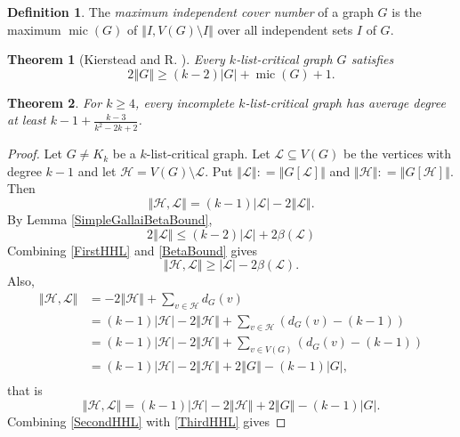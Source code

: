 \documentclass[12pt]{article}
\theoremstyle{plain}
\newtheorem{thm}{Theorem}[section]
\theoremstyle{definition}
\newtheorem{defn}{Definition}
\theoremstyle{remark}
\newcommand{\fancy}[1]{\mathcal{#1}}
\renewcommand{\L}{\fancy{L}}
\newcommand{\HH}{\fancy{H}}
\newcommand{\card}[1]{\left|#1\right|}
\newcommand{\size}[1]{\left\Vert#1\right\Vert}
\newcommand{\parens}[1]{\left( #1 \right)}
\newcommand{\DefinedAs}{\mathrel{\mathop:}=}
\newcommand{\mic}{\operatorname{mic}}
\begin{document}
\begin{defn} The \emph{maximum independent cover number }of a graph $G$
	is the maximum $\mic(G)$ of $\size{I, V(G) \setminus I}$ over all independent sets $I$
	of $G$. 
\end{defn}

\begin{thm}[Kierstead and R. \cite{KernelMagic}]\label{ConsantListMicStrength} 
	Every $k$-list-critical graph $G$ satisfies
	\[2\size{G} \ge (k-2)\card{G} + \mic(G) + 1.\]
\end{thm}

\begin{thm}\label{MainTheorem}
	For $k \ge 4$, every incomplete $k$-list-critical graph has average degree at least $k-1 + \frac{k-3}{k^2-2k+2}$.
\end{thm}
\begin{proof}
	Let $G \ne K_k$ be a $k$-list-critical graph.  Let $\L \subseteq V(G)$ be the vertices with degree $k-1$ and let $\HH = V(G) \setminus \L$.  Put $\size{\L} \DefinedAs \size{G[\L]}$ and $\size{\HH} \DefinedAs \size{G[\HH]}$.  
	Then
	\begin{equation}
		\size{\HH, \L} = (k-1)\card{\L} - 2\size{\L}.
		\label{FirstHHL}
	\end{equation}
	By Lemma \ref{SimpleGallaiBetaBound},
		\begin{equation}
		2\size{\L} \le (k-2)|\L| + 2\beta(\L)
		\label{BetaBound}
		\end{equation}
		Combining \ref{FirstHHL} and \ref{BetaBound} gives
			\begin{equation}
			\size{\HH, \L} \ge \card{\L} - 2\beta(\L).
			\label{SecondHHL}
			\end{equation}
			Also,
			\begin{align*}
			\size{\HH, \L} &= -2\size{\HH} + \sum_{v \in \HH} d_G(v) \\
			&= (k-1)\card{\HH} - 2\size{\HH} + \sum_{v \in \HH} \parens{d_G(v) - (k-1)} \\
			&= (k-1)\card{\HH} - 2\size{\HH} + \sum_{v \in V(G)} \parens{d_G(v) - (k-1)}\\
			&=(k-1)\card{\HH} - 2\size{\HH} + 2\size{G} - (k-1)\card{G},\\
			\end{align*}
			that is
			\begin{equation}
			\size{\HH, \L} = (k-1)\card{\HH} - 2\size{\HH} + 2\size{G} - (k-1)\card{G}.
			\label{ThirdHHL}
			\end{equation}
			Combining \ref{SecondHHL} with \ref{ThirdHHL} gives

\end{proof}
\end{document}
